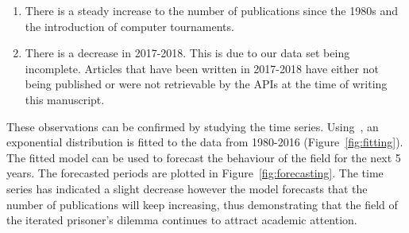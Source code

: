 \documentclass{article}
\theoremstyle{definition}
\begin{document}
\begin{enumerate}
    \item There is a steady increase to the number of publications since the
    1980s and the introduction of computer tournaments.
    \item There is a decrease in 2017-2018. This is due to our data set being
    incomplete. Articles that have been written in 2017-2018 have either not
    being published or were not retrievable by the APIs at the time of writing
    this manuscript.
\end{enumerate}

These observations can be confirmed by studying the time series.
Using~\cite{scipy}, an exponential distribution is fitted to the data from
1980-2016 (Figure~\ref{fig:fitting}).
The fitted model can be used to forecast the behaviour of the field for the
next 5 years. The forecasted periods are plotted in
Figure~\ref{fig:forecasting}. The time series has indicated a slight decrease
however the model forecasts that the number of publications will keep
increasing, thus demonstrating that the field of the iterated prisoner's dilemma
continues to attract academic attention.
\end{document}
